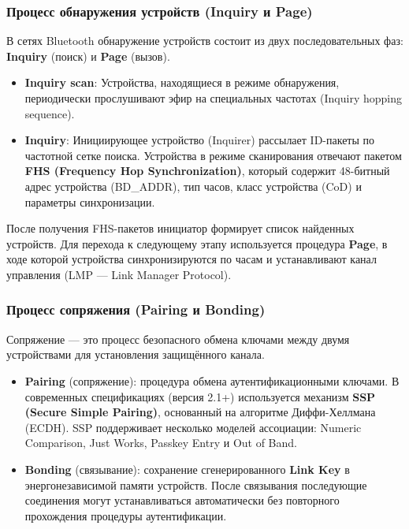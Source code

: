 \subsubsection{Процесс обнаружения устройств (Inquiry и Page)}
В сетях Bluetooth обнаружение устройств состоит из двух последовательных фаз: \textbf{Inquiry} (поиск) и \textbf{Page} (вызов).
\begin{itemize}[nosep]
    \item \textbf{Inquiry scan}: Устройства, находящиеся в режиме обнаружения, периодически прослушивают эфир на специальных частотах (Inquiry hopping sequence).
    \item \textbf{Inquiry}: Инициирующее устройство (Inquirer) рассылает ID-пакеты по частотной сетке поиска. Устройства в режиме сканирования отвечают пакетом \textbf{FHS (Frequency Hop Synchronization)}, который содержит 48-битный адрес устройства (BD\_ADDR), тип часов, класс устройства (CoD) и параметры синхронизации.
\end{itemize}

После получения FHS-пакетов инициатор формирует список найденных устройств. Для перехода к следующему этапу используется процедура \textbf{Page}, в ходе которой устройства синхронизируются по часам и устанавливают канал управления (LMP --- Link Manager Protocol).

\subsubsection{Процесс сопряжения (Pairing и Bonding)}
Сопряжение --- это процесс безопасного обмена ключами между двумя устройствами для установления защищённого канала.
\begin{itemize}[nosep]
    \item \textbf{Pairing} (сопряжение): процедура обмена аутентификационными ключами. В современных спецификациях (версия 2.1+) используется механизм \textbf{SSP (Secure Simple Pairing)}, основанный на алгоритме Диффи-Хеллмана (ECDH). SSP поддерживает несколько моделей ассоциации: Numeric Comparison, Just Works, Passkey Entry и Out of Band.
    \item \textbf{Bonding} (связывание): сохранение сгенерированного \textbf{Link Key} в энергонезависимой памяти устройств. После связывания последующие соединения могут устанавливаться автоматически без повторного прохождения процедуры аутентификации.
\end{itemize}

